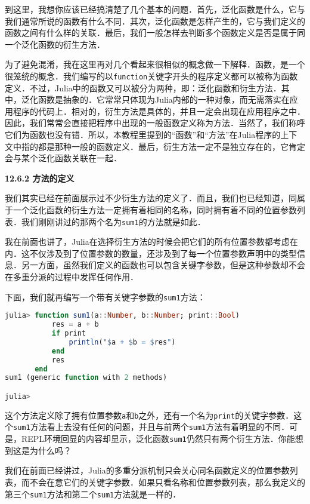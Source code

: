 到这里，我想你应该已经搞清楚了几个基本的问题．首先，泛化函数是什么，它与我们通常所说的函数有什么不同．其次，泛化函数是怎样产生的，它与我们定义的函数之间有什么样的关联．最后，我们一般怎样去判断多个函数定义是否是属于同一个泛化函数的衍生方法．

为了避免混淆，我在这里再对几个看起来很相似的概念做一下解释．函数，是一个很笼统的概念．我们编写的以\verb|function|关键字开头的程序定义都可以被称为函数定义．不过，Julia中的函数又可以被分为两种，即：泛化函数和衍生方法．其中，泛化函数是抽象的．它常常只体现为Julia内部的一种对象，而无需落实在应用程序的代码上．相对的，衍生方法是具体的，并且一定会出现在应用程序之中．因此，我们常常会直接把程序中出现的一般函数定义称为方法．当然了，我们称呼它们为函数也没有错．所以，本教程里提到的“函数”和“方法”在Julia程序的上下文中指的都是那种一般的函数定义．最后，衍生方法一定不是独立存在的，它肯定会与某个泛化函数关联在一起．

\textbf{12.6.2 方法的定义}

我们其实已经在前面展示过不少衍生方法的定义了．而且，我们也已经知道，同属于一个泛化函数的衍生方法一定拥有着相同的名称，同时拥有着不同的位置参数列表．我们刚刚讲过的那两个名为\verb|sum1|的方法就是如此．

我在前面也讲了，Julia在选择衍生方法的时候会把它们的所有位置参数都考虑在内．这不仅涉及到了位置参数的数量，还涉及到了每一个位置参数声明中的类型信息．另一方面，虽然我们定义的函数也可以包含关键字参数，但是这种参数却不会在多重分派的过程中发挥任何作用．

下面，我们就再编写一个带有关键字参数的\verb|sum1|方法：

\begin{lstlisting}[language=julia]
julia> function sum1(a::Number, b::Number; print::Bool)
           res = a + b
           if print
               println("$a + $b = $res")
           end
           res
       end
sum1 (generic function with 2 methods)

julia>
\end{lstlisting}

这个方法定义除了拥有位置参数\verb|a|和\verb|b|之外，还有一个名为\verb|print|的关键字参数．这个\verb|sum1|方法看上去没有任何的问题，并且与前两个\verb|sum1|方法有着明显的不同．可是，REPL环境回显的内容却显示，泛化函数\verb|sum1|仍然只有两个衍生方法．你能想到这是为什么吗？

我们在前面已经讲过，Julia的多重分派机制只会关心同名函数定义的位置参数列表，而不会在意它们的关键字参数．如果只看名称和位置参数列表，那么我定义的第三个\verb|sum1|方法和第二个\verb|sum1|方法就是一样的．

